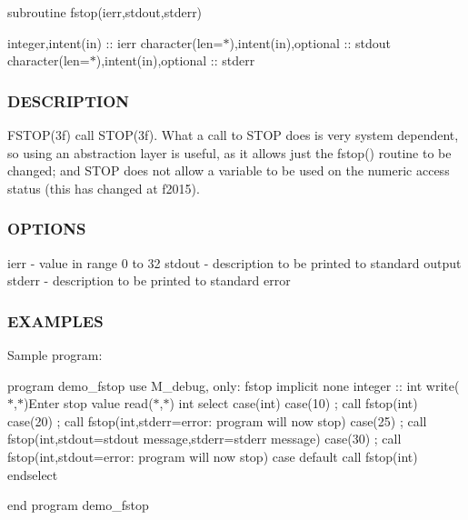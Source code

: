 subroutine fstop(ierr,stdout,stderr)

integer,intent(in) \+:\+: ierr character(len=$\ast$),intent(in),optional \+:\+: stdout character(len=$\ast$),intent(in),optional \+:\+: stderr \subsubsection*{D\+E\+S\+C\+R\+I\+P\+T\+I\+ON}

\begin{DoxyVerb}FSTOP(3f) call STOP(3f).  What a call to STOP does is very system
dependent, so using an abstraction layer is useful, as it allows just
the fstop() routine to be changed; and STOP does not allow a variable
to be used on the numeric access status (this has changed at f2015).
\end{DoxyVerb}


\subsubsection*{O\+P\+T\+I\+O\+NS}

ierr -\/ value in range 0 to 32 stdout -\/ description to be printed to standard output stderr -\/ description to be printed to standard error \subsubsection*{E\+X\+A\+M\+P\+L\+ES}

Sample program\+:

program demo\+\_\+fstop use M\+\_\+debug, only\+: fstop implicit none integer \+:\+: int write($\ast$,$\ast$)\textquotesingle{}Enter stop value\textquotesingle{} read($\ast$,$\ast$) int select case(int) case(10) ; call fstop(int) case(20) ; call fstop(int,stderr=\textquotesingle{}error\+: program will now stop\textquotesingle{}) case(25) ; call fstop(int,stdout=\textquotesingle{}stdout message\textquotesingle{},stderr=\textquotesingle{}stderr message\textquotesingle{}) case(30) ; call fstop(int,stdout=\textquotesingle{}error\+: program will now stop\textquotesingle{}) case default call fstop(int) endselect

end program demo\+\_\+fstop

